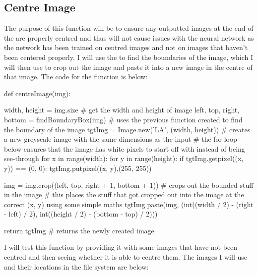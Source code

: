 \documentclass{report}
\begin{document}
\subsection{Centre Image}
The purpose of this function will be to ensure any outputted images at the end of the are properly centred and thus will not cause issues with the neural network as the network has been trained on centred images and not on images that haven't been centered properly. I will use the  to find the boundaries of the image, which I will then use to crop out the image and paste it into a new image in the centre of that image. The code for the function is below:
\begin{python}
def centreImage(img):

    width, height = img.size  # get the width and height of image
    left, top, right, bottom = findBoundaryBox(img)  # uses the previous function created to find the boundary of the image
    tgtImg = Image.new('LA', (width, height))  # creates a new greyscale image with the same dimensions as the input
    # the for loop below ensures that the image has white pixels to start off with instead of being see-through
    for x in range(width):
        for y in range(height):
            if tgtImg.getpixel((x, y)) == (0, 0):
                tgtImg.putpixel((x, y),(255, 255))

    img = img.crop((left, top, right + 1, bottom + 1))  # crops out the bounded stuff in the image
    # this places the stuff that got cropped out into the image at the correct (x, y) using some simple maths
    tgtImg.paste(img, (int((width / 2) - (right - left) / 2), int((height / 2) - (bottom - top) / 2)))

    return tgtImg  # returns the newly created image
\end{python}
I will test this function by providing it with some images that have not been centred and then seeing whether it is able to centre them. The images I will use and their locations in the file system are below:
\end{document}
